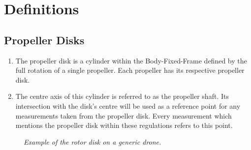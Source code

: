 \documentclass{article}
\begin{document}
\newpage
\section{Definitions}
\subsection{Propeller Disks}
\begin{enumerate}
  \item The propeller disk is a cylinder within the Body-Fixed-Frame defined by the full rotation of a single propeller. Each propeller has its respective propeller disk. 
  \item The centre axis of this cylinder is referred to as the propeller shaft. Its intersection with the disk's centre will be used as a reference point for any measurements taken from the propeller disk. Every measurement which mentions the propeller disk within these regulations refers to this point.
\end{enumerate}

\begin{figure}[h!]
  \centering
 \caption{\textit{Example of the rotor disk on a generic drone.}}
 \end{figure}
\end{document}

